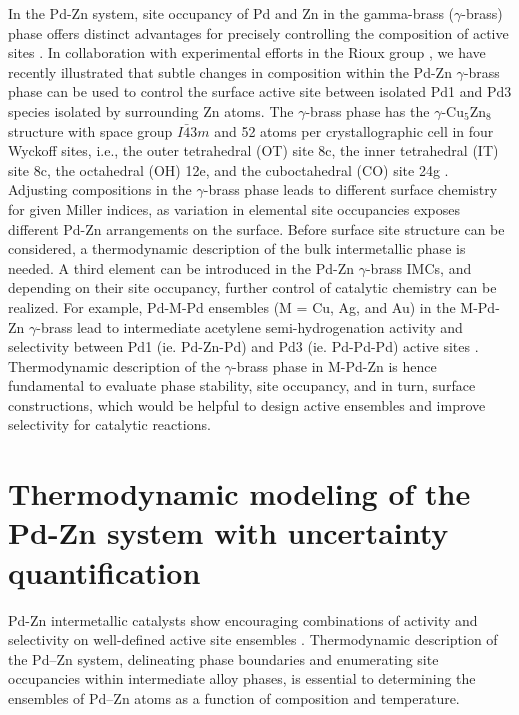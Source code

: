 In the Pd-Zn system, site occupancy of Pd and Zn in the gamma-brass ($\gamma$-brass) phase offers distinct advantages for precisely controlling the composition of active sites \cite{dasgupta2019generalized}. In collaboration with experimental efforts in the Rioux group \cite{Dasgupta2022}, we have recently illustrated that subtle changes in composition within the Pd-Zn $\gamma$-brass phase can be used to control the surface active site between isolated Pd1 and Pd3 species isolated by surrounding Zn atoms. The $\gamma$-brass phase has the $\gamma$-Cu$_5$Zn$_8$ structure with space group $I\bar{4}3m$ and 52 atoms per crystallographic cell in four Wyckoff sites, i.e., the outer tetrahedral (OT) site 8c, the inner tetrahedral (IT) site 8c, the octahedral (OH) 12e, and the cuboctahedral (CO) site 24g \cite{strom1969x}. Adjusting compositions in the $\gamma$-brass phase leads to different surface chemistry for given Miller indices, as variation in elemental site occupancies exposes different Pd-Zn arrangements on the surface. Before surface site structure can be considered, a thermodynamic description of the bulk intermetallic phase is needed. A third element can be introduced in the Pd-Zn $\gamma$-brass IMCs, and depending on their site occupancy, further control of catalytic chemistry can be realized. For example, Pd-M-Pd ensembles (M = Cu, Ag, and Au) in the M-Pd-Zn $\gamma$-brass lead to intermediate acetylene semi-hydrogenation activity and selectivity between Pd1 (ie. Pd-Zn-Pd) and Pd3 (ie. Pd-Pd-Pd) active sites \cite{Dasgupta2022}. Thermodynamic description of the $\gamma$-brass phase in M-Pd-Zn is hence fundamental to evaluate phase stability, site occupancy, and in turn, surface constructions, which would be helpful to design active ensembles and improve selectivity for catalytic reactions. 

\section{Thermodynamic modeling of the Pd-Zn system with uncertainty quantification} \label{intermetallics:sec:PdZn}
Pd-Zn intermetallic catalysts show encouraging combinations of activity and selectivity on well-defined active site ensembles \cite{Dasgupta2022}. Thermodynamic description of the Pd–Zn system, delineating phase boundaries and enumerating site occupancies within intermediate alloy phases, is essential to determining the ensembles of Pd–Zn atoms as a function of composition and temperature. 

